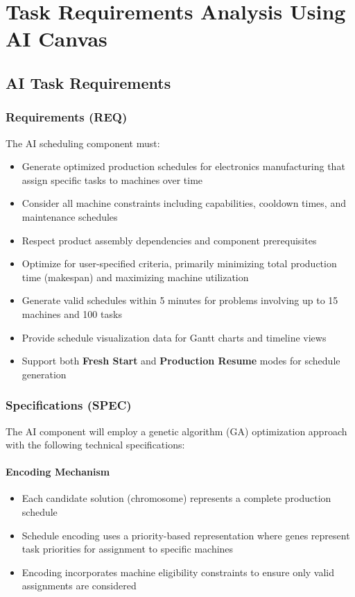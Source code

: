 
\section{Task Requirements Analysis Using AI Canvas}
\label{section:coding-standards}

\subsection{AI Task Requirements}

\subsubsection*{Requirements (REQ)}
The AI scheduling component must:
\begin{itemize}
  \item Generate optimized production schedules for electronics manufacturing that assign specific tasks to machines over time
  \item Consider all machine constraints including capabilities, cooldown times, and maintenance schedules
  \item Respect product assembly dependencies and component prerequisites
  \item Optimize for user-specified criteria, primarily minimizing total production time (makespan) and maximizing machine utilization
  \item Generate valid schedules within 5 minutes for problems involving up to 15 machines and 100 tasks
  \item Provide schedule visualization data for Gantt charts and timeline views
  \item Support both \textbf{Fresh Start} and \textbf{Production Resume} modes for schedule generation
\end{itemize}

\subsubsection*{Specifications (SPEC)}
The AI component will employ a genetic algorithm (GA) optimization approach with the following technical specifications:

\paragraph{Encoding Mechanism}
\begin{itemize}
  \item Each candidate solution (chromosome) represents a complete production schedule
  \item Schedule encoding uses a priority-based representation where genes represent task priorities for assignment to specific machines
  \item Encoding incorporates machine eligibility constraints to ensure only valid assignments are considered
\end{itemize}

